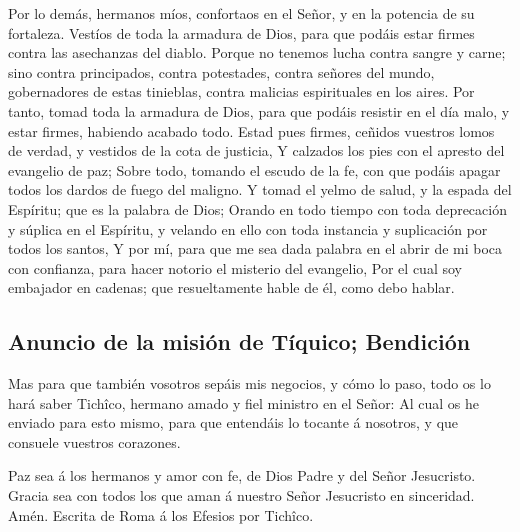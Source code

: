  Por lo demás, hermanos míos, confortaos en el Señor, y en
la potencia de su fortaleza.  Vestíos de toda la armadura
de Dios, para que podáis estar firmes contra las asechanzas del diablo.
 Porque no tenemos lucha contra sangre y carne; sino contra
principados, contra potestades, contra señores del mundo, gobernadores
de estas tinieblas, contra malicias espirituales en los aires.
 Por tanto, tomad toda la armadura de Dios, para que podáis
resistir en el día malo, y estar firmes, habiendo acabado todo.
 Estad pues firmes, ceñidos vuestros lomos de verdad, y
vestidos de la cota de justicia,  Y calzados los pies con
el apresto del evangelio de paz;  Sobre todo, tomando el
escudo de la fe, con que podáis apagar todos los dardos de fuego del
maligno.  Y tomad el yelmo de salud, y la espada del
Espíritu; que es la palabra de Dios;  Orando en todo tiempo
con toda deprecación y súplica en el Espíritu, y velando en ello con
toda instancia y suplicación por todos los santos,  Y por
mí, para que me sea dada palabra en el abrir de mi boca con confianza,
para hacer notorio el misterio del evangelio,  Por el cual
soy embajador en cadenas; que resueltamente hable de él, como debo
hablar.

\hypertarget{anuncio-de-la-misiuxf3n-de-tuxedquico-bendiciuxf3n}{%
\subsection{Anuncio de la misión de Tíquico;
Bendición}\label{anuncio-de-la-misiuxf3n-de-tuxedquico-bendiciuxf3n}}

 Mas para que también vosotros sepáis mis negocios, y cómo
lo paso, todo os lo hará saber Tichîco, hermano amado y fiel ministro en
el Señor:  Al cual os he enviado para esto mismo, para que
entendáis lo tocante á nosotros, y que consuele vuestros corazones.

 Paz sea á los hermanos y amor con fe, de Dios Padre y del
Señor Jesucristo.  Gracia sea con todos los que aman á
nuestro Señor Jesucristo en sinceridad. Amén. Escrita de Roma á los
Efesios por Tichîco.
